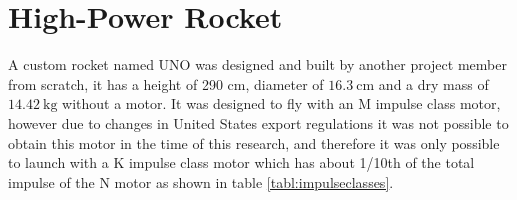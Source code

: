 \documentclass{report}
\begin{document}






\section{High-Power Rocket}

A custom rocket named UNO was designed and built by another project member from scratch, it has a height of 290 cm, diameter of $\SI{16.3}{\centi\metre}$ and a dry mass of $\SI{14.42}{\kilo\gram}$ without a motor. It was designed to fly with an M impulse class motor, however due to changes in United States export regulations it was not possible to obtain this motor in the time of this research, and therefore it was only possible to launch with a K impulse class motor which has about 1/10th of the total impulse of the N motor as shown in table \ref{tabl:impulseclasses}.
\end{document}
